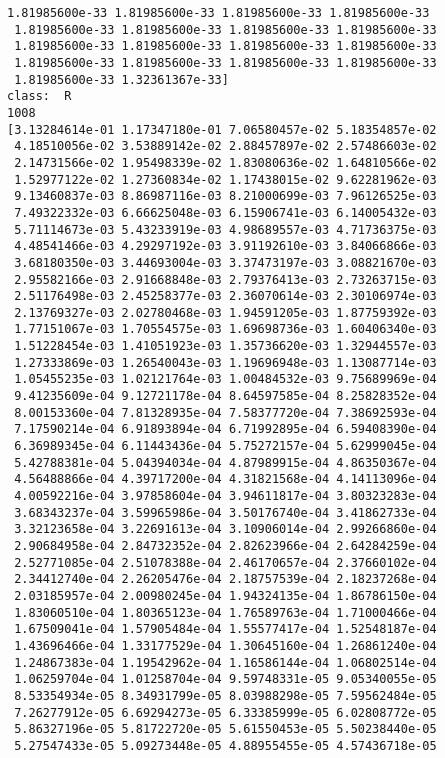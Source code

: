 \documentclass[11pt]{article}
\begin{document}
\begin{Verbatim}[commandchars=\\\{\}]
 1.81985600e-33 1.81985600e-33 1.81985600e-33 1.81985600e-33
 1.81985600e-33 1.81985600e-33 1.81985600e-33 1.81985600e-33
 1.81985600e-33 1.81985600e-33 1.81985600e-33 1.81985600e-33
 1.81985600e-33 1.81985600e-33 1.81985600e-33 1.81985600e-33
 1.81985600e-33 1.32361367e-33]
class:  R
1008
[3.13284614e-01 1.17347180e-01 7.06580457e-02 5.18354857e-02
 4.18510056e-02 3.53889142e-02 2.88457897e-02 2.57486603e-02
 2.14731566e-02 1.95498339e-02 1.83080636e-02 1.64810566e-02
 1.52977122e-02 1.27360834e-02 1.17438015e-02 9.62281962e-03
 9.13460837e-03 8.86987116e-03 8.21000699e-03 7.96126525e-03
 7.49322332e-03 6.66625048e-03 6.15906741e-03 6.14005432e-03
 5.71114673e-03 5.43233919e-03 4.98689557e-03 4.71736375e-03
 4.48541466e-03 4.29297192e-03 3.91192610e-03 3.84066866e-03
 3.68180350e-03 3.44693004e-03 3.37473197e-03 3.08821670e-03
 2.95582166e-03 2.91668848e-03 2.79376413e-03 2.73263715e-03
 2.51176498e-03 2.45258377e-03 2.36070614e-03 2.30106974e-03
 2.13769327e-03 2.02780468e-03 1.94591205e-03 1.87759392e-03
 1.77151067e-03 1.70554575e-03 1.69698736e-03 1.60406340e-03
 1.51228454e-03 1.41051923e-03 1.35736620e-03 1.32944557e-03
 1.27333869e-03 1.26540043e-03 1.19696948e-03 1.13087714e-03
 1.05455235e-03 1.02121764e-03 1.00484532e-03 9.75689969e-04
 9.41235609e-04 9.12721178e-04 8.64597585e-04 8.25828352e-04
 8.00153360e-04 7.81328935e-04 7.58377720e-04 7.38692593e-04
 7.17590214e-04 6.91893894e-04 6.71992895e-04 6.59408390e-04
 6.36989345e-04 6.11443436e-04 5.75272157e-04 5.62999045e-04
 5.42788381e-04 5.04394034e-04 4.87989915e-04 4.86350367e-04
 4.56488866e-04 4.39717200e-04 4.31821568e-04 4.14113096e-04
 4.00592216e-04 3.97858604e-04 3.94611817e-04 3.80323283e-04
 3.68343237e-04 3.59965986e-04 3.50176740e-04 3.41862733e-04
 3.32123658e-04 3.22691613e-04 3.10906014e-04 2.99266860e-04
 2.90684958e-04 2.84732352e-04 2.82623966e-04 2.64284259e-04
 2.52771085e-04 2.51078388e-04 2.46170657e-04 2.37660102e-04
 2.34412740e-04 2.26205476e-04 2.18757539e-04 2.18237268e-04
 2.03185957e-04 2.00980245e-04 1.94324135e-04 1.86786150e-04
 1.83060510e-04 1.80365123e-04 1.76589763e-04 1.71000466e-04
 1.67509041e-04 1.57905484e-04 1.55577417e-04 1.52548187e-04
 1.43696466e-04 1.33177529e-04 1.30645160e-04 1.26861240e-04
 1.24867383e-04 1.19542962e-04 1.16586144e-04 1.06802514e-04
 1.06259704e-04 1.01258704e-04 9.59748331e-05 9.05340055e-05
 8.53354934e-05 8.34931799e-05 8.03988298e-05 7.59562484e-05
 7.26277912e-05 6.69294273e-05 6.33385999e-05 6.02808772e-05
 5.86327196e-05 5.81722720e-05 5.61550453e-05 5.50238440e-05
 5.27547433e-05 5.09273448e-05 4.88955455e-05 4.57436718e-05

\end{Verbatim}
\end{document}
